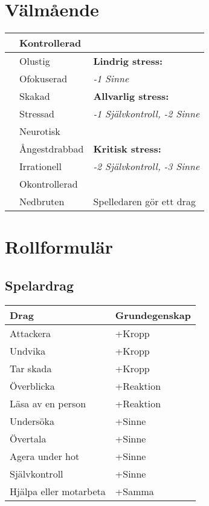 \section*{Välmående}
\begin{table}[!h]
\begin{tabular}{|c| l l|}
\hline & Kontrollerad & \\
\hline & Olustig & \textbf{Lindrig stress:} \\
& Ofokuserad &  \textit{-1 Sinne} \\
\hline & Skakad &  \textbf{Allvarlig stress:} \\
& Stressad & \textit{-1 Självkontroll, -2 Sinne} \\
& Neurotisk &  \\
\hline & Ångestdrabbad &  \textbf{Kritisk stress:} \\
 & Irrationell &  \textit{-2 Självkontroll, -3 Sinne} \\
 & Okontrollerad &  \\
\hline & Nedbruten & Spelledaren gör ett drag \\
\hline
\end{tabular}
\end{table}
\clearpage
\section*{Rollformulär}
\rollformular{}
\subsection*{Spelardrag}
\begin{table}[!h]
  \begin{tabular}{l l}
    Drag & Grundegenskap \\
    \hline \hline
    Attackera & +Kropp\\
    Undvika & +Kropp\\
    Tar skada & +Kropp\\
    Överblicka & +Reaktion\\
    Läsa av en person & +Reaktion\\
    Undersöka & +Sinne\\
    Övertala & +Sinne\\
    Agera under hot & +Sinne\\
    Självkontroll & +Sinne \\
    Hjälpa eller motarbeta & +Samma\\ [1ex]
    \hline
  \end{tabular}
\end{table}
%

